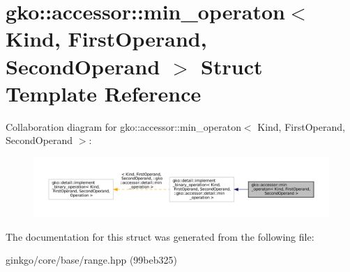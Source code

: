 \hypertarget{structgko_1_1accessor_1_1min__operaton}{}\section{gko\+:\+:accessor\+:\+:min\+\_\+operaton$<$ Kind, First\+Operand, Second\+Operand $>$ Struct Template Reference}
\label{structgko_1_1accessor_1_1min__operaton}


Collaboration diagram for gko\+:\+:accessor\+:\+:min\+\_\+operaton$<$ Kind, First\+Operand, Second\+Operand $>$\+:
\nopagebreak
\begin{figure}[H]
\begin{center}
\leavevmode
\includegraphics[width=350pt]{structgko_1_1accessor_1_1min__operaton__coll__graph}
\end{center}
\end{figure}


The documentation for this struct was generated from the following file\+:\begin{DoxyCompactItemize}
\item 
ginkgo/core/base/range.\+hpp (99beb325)\end{DoxyCompactItemize}
